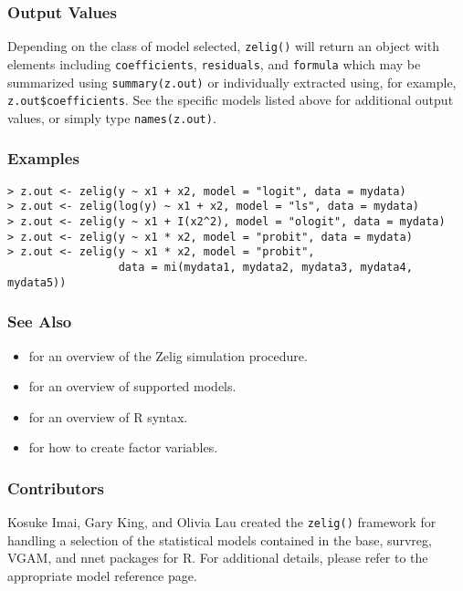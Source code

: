 \subsubsection{Output Values}
Depending on the class of model selected, \texttt{zelig()} will return
an object with elements including \texttt{coefficients}, \texttt{residuals},
and \texttt{formula} which may be summarized using
\texttt{summary(z.out)} or individually extracted using, for example,
\texttt{z.out\$coefficients}.  See the specific models listed above
for additional output values, or simply type {\tt names(z.out)}.  

\subsubsection{Examples}
\begin{verbatim}
> z.out <- zelig(y ~ x1 + x2, model = "logit", data = mydata)
> z.out <- zelig(log(y) ~ x1 + x2, model = "ls", data = mydata)
> z.out <- zelig(y ~ x1 + I(x2^2), model = "ologit", data = mydata)
> z.out <- zelig(y ~ x1 * x2, model = "probit", data = mydata)
> z.out <- zelig(y ~ x1 * x2, model = "probit",  
                 data = mi(mydata1, mydata2, mydata3, mydata4, mydata5))
\end{verbatim}

\subsubsection{See Also}
\begin{itemize}
  \item {} for an overview of the Zelig simulation procedure.
  \item {} for an overview of supported models.  
  \item {} for an overview of R syntax.  
  \item {} for how to create factor variables.  
\end{itemize}

\subsubsection{Contributors}

Kosuke Imai, Gary King, and Olivia Lau created the {\tt zelig()}
framework for handling a selection of the statistical models contained
in the base, survreg, VGAM, and nnet packages for R.  For additional
details, please refer to the appropriate model reference page.




























